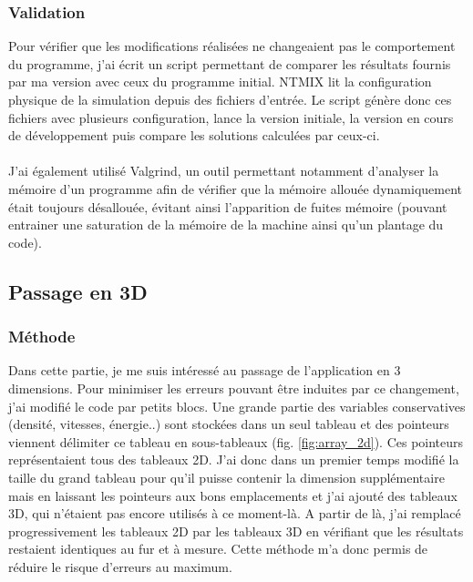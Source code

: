

\subsubsection{Validation}Pour vérifier que les modifications réalisées ne changeaient pas le comportement du programme, j'ai écrit un script permettant de comparer les résultats fournis par ma version avec ceux du programme initial. NTMIX lit la configuration physique de la simulation depuis des fichiers d'entrée. Le script génère donc ces fichiers avec plusieurs configuration, lance la version initiale, la version en cours de développement puis compare les solutions calculées par ceux-ci.

\paragraph{}J'ai également utilisé Valgrind, un outil permettant notamment d'analyser la mémoire d'un programme afin de vérifier que la mémoire allouée dynamiquement était toujours désallouée, évitant ainsi l'apparition de fuites mémoire (pouvant entrainer une saturation de la mémoire de la machine ainsi qu'un plantage du code).




\subsection{Passage en 3D}

\subsubsection{Méthode}\label{sec:3dmeth}
Dans cette partie, je me suis intéressé au passage de l'application en 3 dimensions. Pour minimiser les erreurs pouvant être induites par ce changement, j'ai modifié le code par petits blocs. Une grande partie des variables conservatives (densité, vitesses, énergie..) sont stockées dans un seul tableau et des pointeurs viennent délimiter ce tableau en sous-tableaux (fig. \ref{fig:array_2d}). Ces pointeurs représentaient tous des tableaux 2D. J'ai donc dans un premier temps modifié la taille du grand tableau pour qu'il puisse contenir la dimension supplémentaire mais en laissant les pointeurs aux bons emplacements et j'ai ajouté des tableaux 3D, qui n'étaient pas encore utilisés à ce moment-là. A partir de là, j'ai remplacé progressivement les tableaux 2D par les tableaux 3D en vérifiant que les résultats restaient identiques au fur et à mesure. Cette méthode m'a donc permis de réduire le risque d'erreurs au maximum.


